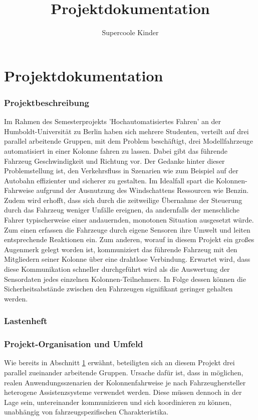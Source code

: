 \documentclass[a4paper, 12pt, titlepage]{scrartcl}
\begin{document}
	
\author{Supercoole Kinder}
\title{Projektdokumentation} 
\publishers{Humboldt-Universit\"at zu Berlin}
\maketitle
\tableofcontents

\part{Projektdokumentation}
	\section{Projektbeschreibung}
	\label{projektbeschreibung}
		Im Rahmen des Semesterprojekts 'Hochautomatisiertes Fahren' an der Humboldt-Universität zu Berlin haben sich mehrere Studenten, verteilt auf drei parallel arbeitende Gruppen, 
		mit dem Problem beschäftigt, drei Modellfahrzeuge automatisiert in einer Kolonne fahren zu lassen. 
		Dabei gibt das führende Fahrzeug Geschwindigkeit und Richtung vor. Der Gedanke hinter dieser Problemstellung ist, 
		den Verkehrsfluss in Szenarien wie zum Beispiel auf der Autobahn effizienter und sicherer zu gestalten. 
		Im Idealfall spart die Kolonnen-Fahrweise aufgrund der Ausnutzung des Windschattens Ressourcen wie Benzin. 
		Zudem wird erhofft, dass sich durch die zeitweilige Übernahme der Steuerung durch das Fahrzeug weniger Unfälle ereignen, 
		da andernfalls der menschliche Fahrer typischerweise einer andauernden, monotonen Situation ausgesetzt würde. 
		Zum einen erfassen die Fahrzeuge durch eigene Sensoren ihre Umwelt und leiten entsprechende Reaktionen ein. 
		Zum anderen, worauf in diesem Projekt ein großes Augenmerk gelegt worden ist, kommuniziert das führende Fahrzeug mit den Mitgliedern seiner Kolonne über eine drahtlose Verbindung. 
		Erwartet wird, dass diese Kommunikation schneller durchgeführt wird als die Auswertung der Sensordaten jedes einzelnen Kolonnen-Teilnehmers. 
		In Folge dessen können die Sicherheitsabstände zwischen den Fahrzeugen signifikant geringer gehalten werden. 
	\section{Lastenheft} 
	\label{lastenheft}
	\section{Projekt-Organisation und Umfeld} 
	\label{umfeld}
		Wie bereits in Abschnitt \ref{projektbeschreibung} erwähnt, beteiligten sich an diesem Projekt drei parallel zueinander arbeitende Gruppen. 
		Ursache dafür ist, dass in möglichen, realen Anwendungsszenarien der Kolonnenfahrweise je nach Fahrzeughersteller heterogene 
		Assistenzsysteme verwendet werden. Diese müssen dennoch in der Lage sein, untereinander kommunizieren und sich koordinieren zu können, unabhängig von fahrzeugspezifischen Charakteristika.
		
\end{document}
